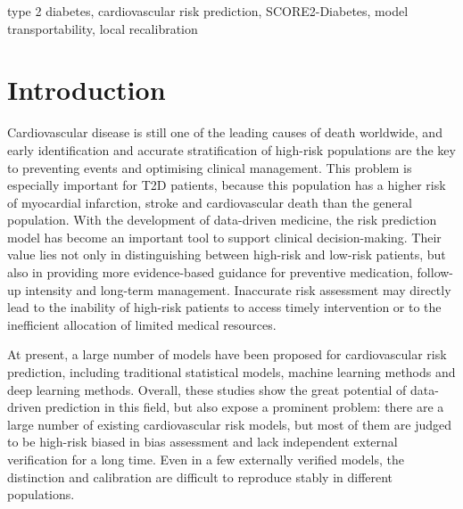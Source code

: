 \documentclass[conference]{IEEEtran}
\begin{document}
\begin{IEEEkeywords}
type 2 diabetes, cardiovascular risk prediction, SCORE2-Diabetes, model transportability, local recalibration
\end{IEEEkeywords}

\section{Introduction}
Cardiovascular disease is still one of the leading causes of death worldwide, and early identification and accurate stratification of high-risk populations are the key to preventing events and optimising clinical management\cite{world2021world}. This problem is especially important for T2D patients, because this population has a higher risk of myocardial infarction, stroke and cardiovascular death than the general population\cite{henning2018type}. With the development of data-driven medicine, the risk prediction model has become an important tool to support clinical decision-making. Their value lies not only in distinguishing between high-risk and low-risk patients, but also in providing more evidence-based guidance for preventive medication, follow-up intensity and long-term management\cite{rani2026data}. Inaccurate risk assessment may directly lead to the inability of high-risk patients to access timely intervention or to the inefficient allocation of limited medical resources.

At present, a large number of models have been proposed for cardiovascular risk prediction, including traditional statistical models, machine learning methods and deep learning methods\cite{galbete2022cardiovascular}. Overall, these studies show the great potential of data-driven prediction in this field, but also expose a prominent problem: there are a large number of existing cardiovascular risk models, but most of them are judged to be high-risk biased in bias assessment and lack independent external verification for a long time. Even in a few externally verified models, the distinction and calibration are difficult to reproduce stably in different populations.
\end{document}
